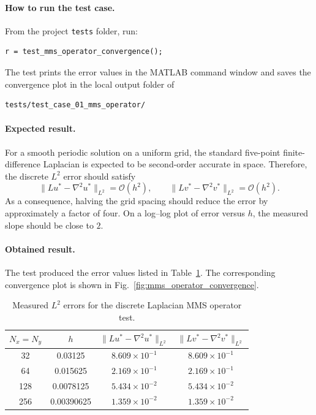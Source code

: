 \paragraph{How to run the test case.}
From the project \texttt{tests} folder, run:
\begin{verbatim}
r = test_mms_operator_convergence();
\end{verbatim}

The test prints the error values in the MATLAB command window and saves the convergence plot in the local output folder of
\begin{verbatim}
tests/test_case_01_mms_operator/
\end{verbatim}

\paragraph{Expected result.}
For a smooth periodic solution on a uniform grid, the standard five-point finite-difference Laplacian is expected to be second-order accurate in space. Therefore, the discrete \(L^2\) error should satisfy
\[
\|L u^\ast - \nabla^2 u^\ast\|_{L^2} = \mathcal{O}(h^2),
\qquad
\|L v^\ast - \nabla^2 v^\ast\|_{L^2} = \mathcal{O}(h^2).
\]
As a consequence, halving the grid spacing should reduce the error by approximately a factor of four. On a log--log plot of error versus \(h\), the measured slope should be close to \(2\).

\paragraph{Obtained result.}
The test produced the error values listed in Table~\ref{tab:mms_operator_convergence_data}. The corresponding convergence plot is shown in Fig.~\ref{fig:mms_operator_convergence}.

\begin{table}[htbp]
\centering
\caption{Measured \(L^2\) errors for the discrete Laplacian MMS operator test.}
\label{tab:mms_operator_convergence_data}
\begin{tabular}{|c|c|c|c|}
\hline
\(N_x=N_y\) & \(h\) & \(\|L u^\ast - \nabla^2 u^\ast\|_{L^2}\) & \(\|L v^\ast - \nabla^2 v^\ast\|_{L^2}\) \\
\hline
32  & 0.03125   & \(8.609\times 10^{-1}\) & \(8.609\times 10^{-1}\) \\
64  & 0.015625  & \(2.169\times 10^{-1}\) & \(2.169\times 10^{-1}\) \\
128 & 0.0078125 & \(5.434\times 10^{-2}\) & \(5.434\times 10^{-2}\) \\
256 & 0.00390625 & \(1.359\times 10^{-2}\) & \(1.359\times 10^{-2}\) \\
\hline
\end{tabular}
\end{table}

